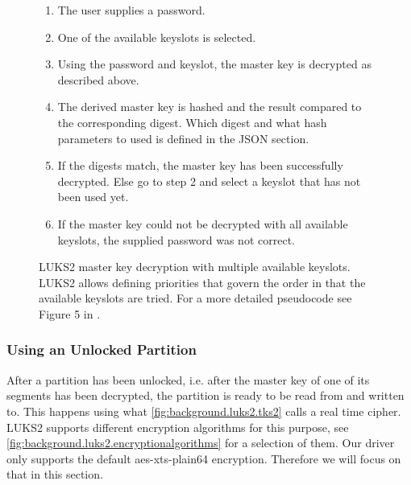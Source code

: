 \begin{figure}[htb!]
	\center
	\begin{mdframed}
		\begin{enumerate}
			\item The user supplies a password.
			\item One of the available keyslots is selected.
			\item Using the password and keyslot, the master key is decrypted as described above.
			\item The derived master key is hashed and the result compared to the corresponding digest. Which digest and what hash parameters to used is defined in the JSON section.
			\item If the digests match, the master key has been successfully decrypted. Else go to step 2 and select a keyslot that has not been used yet.
			\item If the master key could not be decrypted with all available keyslots, the supplied password was not correct.
		\end{enumerate}
	\end{mdframed}
	\caption[
		LUKS2 master key decryption with multiple available keyslots
	]{
		LUKS2 master key decryption with multiple available keyslots. LUKS2 allows defining priorities that govern the order in that the available keyslots are tried. For a more detailed pseudocode see Figure 5 in \cite{Fruwirth2018}.
	}
	\label{fig:background.luks2.unlocking}
\end{figure}

\subsubsection{Using an Unlocked Partition}
\label{chap:background.luks2.using}
After a partition has been unlocked, i.e. after the master key of one of its segments has been decrypted, the partition is ready to be read from and written to. This happens using what \autoref{fig:background.luks2.tks2} calls a real time cipher. LUKS2 supports different encryption algorithms for this purpose, see \autoref{fig:background.luks2.encryptionalgorithms} for a selection of them. Our driver only supports the default aes-xts-plain64 encryption. Therefore we will focus on that in this section.

